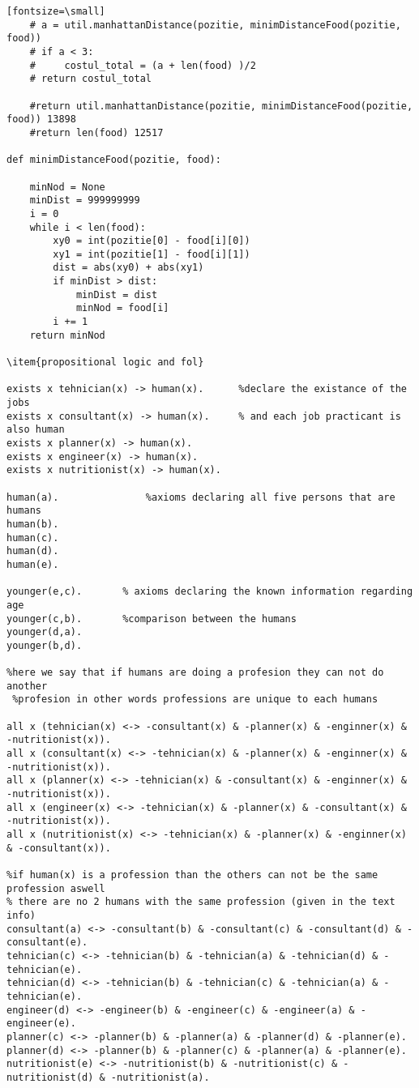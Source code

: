 \begin{verbatim}[fontsize=\small]
    # a = util.manhattanDistance(pozitie, minimDistanceFood(pozitie, food))
    # if a < 3:
    #     costul_total = (a + len(food) )/2
    # return costul_total

    #return util.manhattanDistance(pozitie, minimDistanceFood(pozitie, food)) 13898
    #return len(food) 12517

def minimDistanceFood(pozitie, food):

    minNod = None
    minDist = 999999999
    i = 0
    while i < len(food):
        xy0 = int(pozitie[0] - food[i][0])
        xy1 = int(pozitie[1] - food[i][1])
        dist = abs(xy0) + abs(xy1)
        if minDist > dist:
            minDist = dist
            minNod = food[i]
        i += 1
    return minNod

\item{propositional logic and fol}

exists x tehnician(x) -> human(x).      %declare the existance of the jobs
exists x consultant(x) -> human(x).     % and each job practicant is also human 
exists x planner(x) -> human(x).
exists x engineer(x) -> human(x).
exists x nutritionist(x) -> human(x).

human(a).               %axioms declaring all five persons that are humans
human(b). 
human(c).
human(d).
human(e).

younger(e,c).  		% axioms declaring the known information regarding age 
younger(c,b). 		%comparison between the humans
younger(d,a).
younger(b,d).

%here we say that if humans are doing a profesion they can not do another
 %profesion in other words professions are unique to each humans

all x (tehnician(x) <-> -consultant(x) & -planner(x) & -enginner(x) & -nutritionist(x)).
all x (consultant(x) <-> -tehnician(x) & -planner(x) & -enginner(x) & -nutritionist(x)).
all x (planner(x) <-> -tehnician(x) & -consultant(x) & -enginner(x) & -nutritionist(x)).
all x (engineer(x) <-> -tehnician(x) & -planner(x) & -consultant(x) & -nutritionist(x)).
all x (nutritionist(x) <-> -tehnician(x) & -planner(x) & -enginner(x) & -consultant(x)).

%if human(x) is a profession than the others can not be the same profession aswell
% there are no 2 humans with the same profession (given in the text info)
consultant(a) <-> -consultant(b) & -consultant(c) & -consultant(d) & -consultant(e).
tehnician(c) <-> -tehnician(b) & -tehnician(a) & -tehnician(d) & -tehnician(e).
tehnician(d) <-> -tehnician(b) & -tehnician(c) & -tehnician(a) & -tehnician(e).
engineer(d) <-> -engineer(b) & -engineer(c) & -engineer(a) & -engineer(e).
planner(c) <-> -planner(b) & -planner(a) & -planner(d) & -planner(e).
planner(d) <-> -planner(b) & -planner(c) & -planner(a) & -planner(e).
nutritionist(e) <-> -nutritionist(b) & -nutritionist(c) & -nutritionist(d) & -nutritionist(a).


\end{verbatim}
